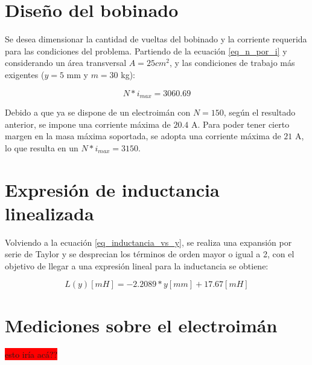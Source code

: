 \section{Diseño del bobinado}

\noindent Se desea dimensionar la cantidad de vueltas del bobinado y la corriente requerida para las condiciones del problema. Partiendo de la ecuación \ref{eq_n_por_i} y considerando un área transversal $A=25 cm^{2}$, y las condiciones de trabajo más exigentes ($y=5$ mm y $m=30$ kg):

\begin{equation}
	N*i_{max}=3060.69 
\end{equation}

\noindent Debido a que ya se dispone de un electroimán con $N=150$, según el resultado anterior, se impone una corriente máxima de $20.4$ A. Para poder tener cierto margen en la masa máxima soportada, se adopta una corriente máxima de $21$ A, lo que resulta en un $N*i_{max}=3150$.



\section{Expresión de inductancia linealizada}

\noindent Volviendo a la ecuación \ref{eq_inductancia_vs_y}, se realiza una expansión por serie de Taylor y se desprecian los términos de orden mayor o igual a 2, con el objetivo de llegar a una expresión lineal para la inductancia se obtiene:

\begin{equation} \label{eq_inductancia_lineal_teorica}
	L(y)[mH]=-2.2089*y[mm]+17.67 [mH]
\end{equation}

\section{Mediciones sobre el electroimán}

\colorbox{red}{esto iría acá??}


